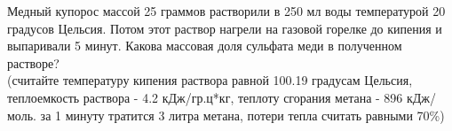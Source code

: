 Медный купорос массой 25 граммов растворили в 250 мл воды температурой 20 градусов Цельсия. Потом этот раствор нагрели на газовой горелке до кипения и выпаривали 5 минут. Какова массовая доля сульфата меди в полученном растворе?
\\
(считайте температуру кипения раствора равной 100.19 градусам Цельсия, теплоемкость раствора - 4.2 кДж/гр.ц*кг, теплоту сгорания метана - 896 кДж/моль. за 1 минуту тратится 3 литра метана, потери тепла считать равными 70\%)

